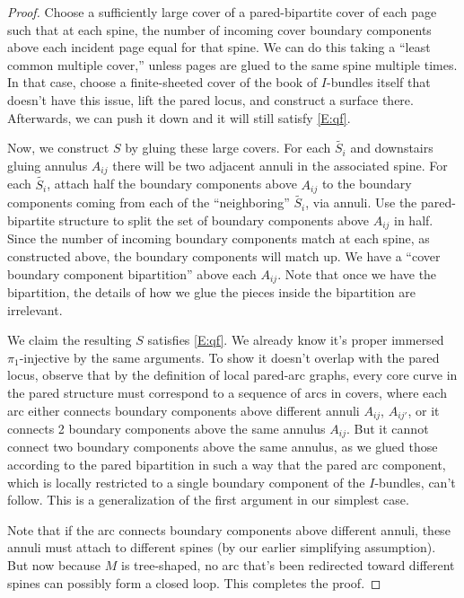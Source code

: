 {\begin{proof}
Choose a sufficiently large cover of a pared-bipartite cover of each page such
that at each spine, the number of incoming cover boundary components above each
incident page equal for that spine. We can do this taking a ``least common
multiple cover,'' unless pages are glued to the same spine multiple times. In
that case, choose a finite-sheeted cover of the book of $I$-bundles itself that
doesn't have this issue, lift the pared locus, and construct a surface there.
Afterwards, we can push it down and it will still satisfy \eqref{E:qf}.


Now, we construct $S$ by gluing these large covers. For each $\widetilde{S_i}$
and downstairs gluing annulus $A_{ij}$ there will be two adjacent annuli in the
associated spine. For each $\widetilde{S_i}$, attach half the boundary
components above $A_{ij}$ to the boundary components coming from each of the
``neighboring'' $\widetilde{S_i}$, via annuli. Use the pared-bipartite
structure to split the set of boundary components above $A_{ij}$ in half. Since
the number of incoming boundary components match at each spine, as constructed
above, the boundary components will match up. We have a ``cover boundary
component bipartition'' above each $A_{ij}$. Note that once we have the
bipartition, the details of how we glue the pieces inside the bipartition are
irrelevant.

We claim the resulting $S$ satisfies \eqref{E:qf}. We already know it's proper
immersed $\pi_1$-injective by the same arguments. To show it doesn't overlap
with the pared locus, observe that by the definition of local pared-arc graphs,
every core curve in the pared structure must correspond to a sequence of arcs
in covers, where each arc either connects boundary components above different
annuli $A_{ij}$, $A_{ij'}$, or it connects 2 boundary components above the same
annulus $A_{ij}$. But it cannot connect two boundary components above the same
annulus, as we glued those according to the pared bipartition in such a way
that the pared arc component, which is locally restricted to a single boundary
component of the $I$-bundles, can't follow. This is a generalization of the
first argument in our simplest case.

Note that if the arc connects boundary components above different annuli, these
annuli must attach to different spines (by our earlier simplifying assumption).
But now because $M$ is tree-shaped, no arc that's been redirected toward
different spines can possibly form a closed loop. This completes the proof.


\end{proof}}
